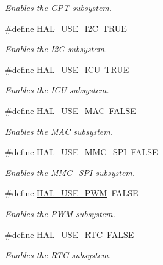\begin{DoxyCompactItemize}
\begin{DoxyCompactList}\small\item\em Enables the G\+P\+T subsystem. \end{DoxyCompactList}\item 
\#define \hyperlink{group___h_a_l___c_o_n_f_gae5eb94efa72e401dc17a356b27f4e7e5}{H\+A\+L\+\_\+\+U\+S\+E\+\_\+\+I2\+C}~T\+R\+U\+E
\begin{DoxyCompactList}\small\item\em Enables the I2\+C subsystem. \end{DoxyCompactList}\item 
\#define \hyperlink{group___h_a_l___c_o_n_f_gac58fde738d018b1233a5441ae4c6245b}{H\+A\+L\+\_\+\+U\+S\+E\+\_\+\+I\+C\+U}~T\+R\+U\+E
\begin{DoxyCompactList}\small\item\em Enables the I\+C\+U subsystem. \end{DoxyCompactList}\item 
\#define \hyperlink{group___h_a_l___c_o_n_f_ga0da24d012c72a79db22e5621b391d3da}{H\+A\+L\+\_\+\+U\+S\+E\+\_\+\+M\+A\+C}~F\+A\+L\+S\+E
\begin{DoxyCompactList}\small\item\em Enables the M\+A\+C subsystem. \end{DoxyCompactList}\item 
\#define \hyperlink{group___h_a_l___c_o_n_f_gafc4461ac2cc33590839ed91f2e940079}{H\+A\+L\+\_\+\+U\+S\+E\+\_\+\+M\+M\+C\+\_\+\+S\+P\+I}~F\+A\+L\+S\+E
\begin{DoxyCompactList}\small\item\em Enables the M\+M\+C\+\_\+\+S\+P\+I subsystem. \end{DoxyCompactList}\item 
\#define \hyperlink{group___h_a_l___c_o_n_f_gafb7a560610f96b2858d51c36d65f8c2f}{H\+A\+L\+\_\+\+U\+S\+E\+\_\+\+P\+W\+M}~F\+A\+L\+S\+E
\begin{DoxyCompactList}\small\item\em Enables the P\+W\+M subsystem. \end{DoxyCompactList}\item 
\#define \hyperlink{group___h_a_l___c_o_n_f_ga17d20632810c9bb1601a19973977f55c}{H\+A\+L\+\_\+\+U\+S\+E\+\_\+\+R\+T\+C}~F\+A\+L\+S\+E
\begin{DoxyCompactList}\small\item\em Enables the R\+T\+C subsystem. \end{DoxyCompactList}\item 

\end{DoxyCompactItemize}
